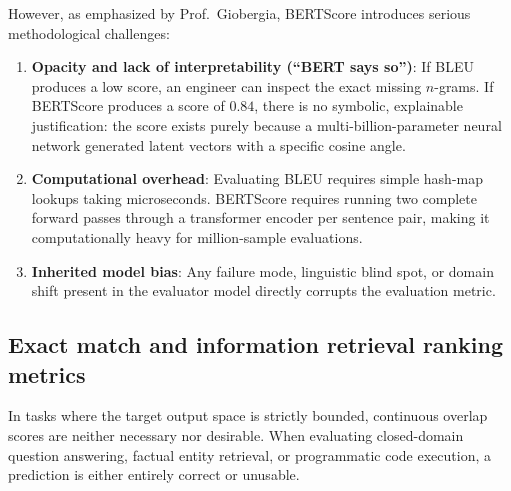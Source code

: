 \documentclass[../../main.tex]{subfiles}
\begin{document}
However, as emphasized by Prof.~Giobergia, BERTScore introduces serious methodological challenges:
\begin{enumerate}
    \item \textbf{Opacity and lack of interpretability (``BERT says so'')}: If BLEU produces a low score, an engineer can inspect the exact missing $n$-grams. If BERTScore produces a score of $0.84$, there is no symbolic, explainable justification: the score exists purely because a multi-billion-parameter neural network generated latent vectors with a specific cosine angle.
    \item \textbf{Computational overhead}: Evaluating BLEU requires simple hash-map lookups taking microseconds. BERTScore requires running two complete forward passes through a transformer encoder per sentence pair, making it computationally heavy for million-sample evaluations.
    \item \textbf{Inherited model bias}: Any failure mode, linguistic blind spot, or domain shift present in the evaluator model directly corrupts the evaluation metric.
\end{enumerate}

\subsection{Exact match and information retrieval ranking metrics}
\label{subsec:exact_match_ranking}

In tasks where the target output space is strictly bounded, continuous overlap scores are neither necessary nor desirable. When evaluating closed-domain question answering, factual entity retrieval, or programmatic code execution, a prediction is either entirely correct or unusable.
\end{document}
